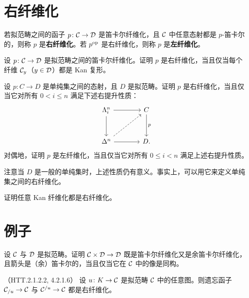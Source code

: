 \section{右纤维化}

\begin{definition}\label{L19-4.1}
若拟范畴之间的函子 $p\colon\mathcal{C}\to\mathcal{D}$ 是笛卡尔纤维化，且 $\mathcal{C}$ 中任意态射都是 $p$-笛卡尔的，则称 $p$ 是\textbf{右纤维化}。若 $p^{\mathrm{op}}$ 是右纤维化，则称 $p$ 是\textbf{左纤维化}。
\end{definition}

\begin{exercise}\label{L19-4.2}
设 $p\colon\mathcal{C}\to\mathcal{D}$ 是拟范畴之间的笛卡尔纤维化。证明 $p$ 是右纤维化，当且仅当每个纤维 $\mathcal{C}_y$（$y\in\mathcal{D}$）都是 Kan 复形。
\end{exercise}

\begin{exercise}\label{L19-4.3}
设 $p\colon C\to D$ 是单纯集之间的态射，且 $D$ 是拟范畴。证明 $p$ 是右纤维化，当且仅当它对所有 $0<i\le n$ 满足下述右提升性质：
\[
\begin{tikzcd}[column sep=3.8em,row sep=3em]
\Lambda^n_i \arrow[r] \arrow[d] & C \arrow[d,"p"]\\
\Delta^n \arrow[r] \arrow[ur,dashed] & D.
\end{tikzcd}
\]
对偶地，证明 $p$ 是左纤维化，当且仅当它对所有 $0\le i<n$ 满足上述右提升性质。
\end{exercise}

\begin{remark}\label{L19-4.4}
注意当 $D$ 是一般的单纯集时，上述性质仍有意义。事实上，可以用它来定义单纯集之间的右纤维化。
\end{remark}

\begin{exercise}\label{L19-4.5}
证明任意 Kan 纤维化都是右纤维化。
\end{exercise}

\section{例子}

\begin{exercise}\label{L19-5.1}
设 $\mathcal{C}$ 与 $\mathcal{D}$ 是拟范畴。证明 $\mathcal{C}\times\mathcal{D}\to\mathcal{D}$ 既是笛卡尔纤维化又是余笛卡尔纤维化，且箭头是（余）笛卡尔的，当且仅当它在 $\mathcal{C}$ 中的像是同构。
\end{exercise}

\begin{example}\label{L19-5.2}（HTT.2.1.2.2, 4.2.1.6）
设 $u\colon K\to\mathcal{C}$ 是拟范畴 $\mathcal{C}$ 中的任意图。则遗忘函子 $\mathcal{C}_{/u}\to\mathcal{C}$ 与 $\mathcal{C}^{/u}\to\mathcal{C}$ 都是右纤维化。
\end{example}

